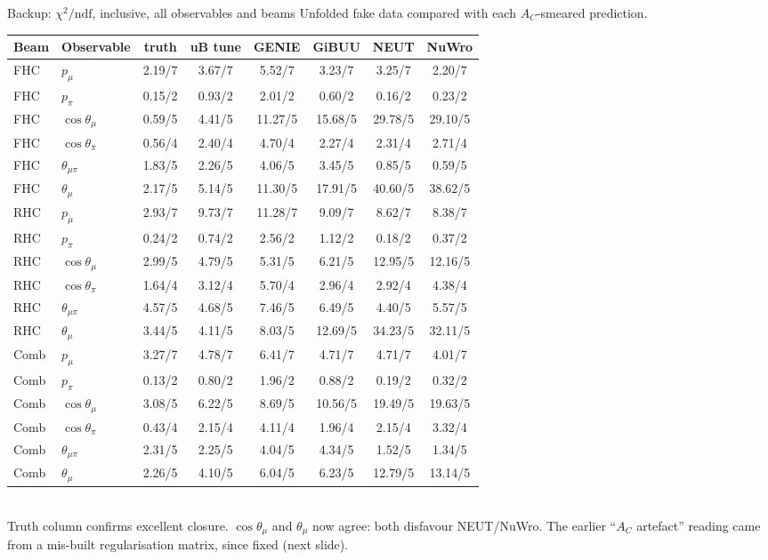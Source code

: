 \documentclass[aspectratio=169,10pt]{beamer}
\begin{document}
{\begin{frame}{Backup: $\chi^2/\mathrm{ndf}$, inclusive, all observables and beams}
  \centering\scriptsize
  Unfolded fake data compared with each $A_C$-smeared prediction.
  \begin{tabular}{llcccccc}
  \toprule
  Beam & Observable & truth & uB tune & GENIE & GiBUU & NEUT & NuWro\\\midrule
  FHC & $p_\mu$          & 2.19/7 & 3.67/7 & 5.52/7 & 3.23/7 & 3.25/7 & 2.20/7\\
  FHC & $p_\pi$          & 0.15/2 & 0.93/2 & 2.01/2 & 0.60/2 & 0.16/2 & 0.23/2\\
  FHC & $\cos\theta_\mu$ & 0.59/5 & 4.41/5 & 11.27/5 & 15.68/5 & \alert{29.78/5} & \alert{29.10/5}\\
  FHC & $\cos\theta_\pi$ & 0.56/4 & 2.40/4 & 4.70/4 & 2.27/4 & 2.31/4 & 2.71/4\\
  FHC & $\theta_{\mu\pi}$& 1.83/5 & 2.26/5 & 4.06/5 & 3.45/5 & 0.85/5 & 0.59/5\\
  FHC & $\theta_\mu$     & 2.17/5 & 5.14/5 & 11.30/5 & 17.91/5 & \alert{40.60/5} & \alert{38.62/5}\\\midrule
  RHC & $p_\mu$          & 2.93/7 & 9.73/7 & 11.28/7 & 9.09/7 & 8.62/7 & 8.38/7\\
  RHC & $p_\pi$          & 0.24/2 & 0.74/2 & 2.56/2 & 1.12/2 & 0.18/2 & 0.37/2\\
  RHC & $\cos\theta_\mu$ & 2.99/5 & 4.79/5 & 5.31/5 & 6.21/5 & \alert{12.95/5} & \alert{12.16/5}\\
  RHC & $\cos\theta_\pi$ & 1.64/4 & 3.12/4 & 5.70/4 & 2.96/4 & 2.92/4 & 4.38/4\\
  RHC & $\theta_{\mu\pi}$& 4.57/5 & 4.68/5 & 7.46/5 & 6.49/5 & 4.40/5 & 5.57/5\\
  RHC & $\theta_\mu$     & 3.44/5 & 4.11/5 & 8.03/5 & 12.69/5 & \alert{34.23/5} & \alert{32.11/5}\\\midrule
  Comb & $p_\mu$          & 3.27/7 & 4.78/7 & 6.41/7 & 4.71/7 & 4.71/7 & 4.01/7\\
  Comb & $p_\pi$          & 0.13/2 & 0.80/2 & 1.96/2 & 0.88/2 & 0.19/2 & 0.32/2\\
  Comb & $\cos\theta_\mu$ & 3.08/5 & 6.22/5 & 8.69/5 & 10.56/5 & \alert{19.49/5} & \alert{19.63/5}\\
  Comb & $\cos\theta_\pi$ & 0.43/4 & 2.15/4 & 4.11/4 & 1.96/4 & 2.15/4 & 3.32/4\\
  Comb & $\theta_{\mu\pi}$& 2.31/5 & 2.25/5 & 4.04/5 & 4.34/5 & 1.52/5 & 1.34/5\\
  Comb & $\theta_\mu$     & 2.26/5 & 4.10/5 & 6.04/5 & 6.23/5 & \alert{12.79/5} & \alert{13.14/5}\\
  \bottomrule
  \end{tabular}\\[1mm]
  {\scriptsize Truth column confirms excellent closure. \alert{$\cos\theta_\mu$ and $\theta_\mu$ now agree}: both disfavour NEUT/NuWro. The earlier ``$A_C$ artefact'' reading came from a mis-built regularisation matrix, since fixed (next slide).}
\end{frame}

}
\end{document}
